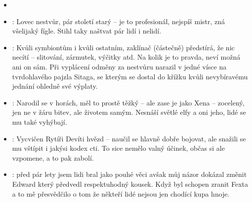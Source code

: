 \documentclass[../main.tex]{subfiles}
\begin{document}
\begin{itemize}
	\item {}
	\item {}: Lovec nestvůr, pár století starý – je to profesionál, nejspíš mistr, zná všelijaký fígle. Stihl taky naštvat pár lidí i nelidí.
	\item {}: Kvůli symbiontům i kvůli ostatním, zaklínač (částečně) předstírá, že nic necítí – slitování, zármutek, výčitky atd. Na kolik je to pravda, neví možná ani on sám. Při vyplácení odměny za nestvůru narazil v jedné vísce na tvrdohlavého pajzla Sitaga, se kterým se dostal do křížku kvůli nevybíravému jednání ohledně své výplaty.
	\item {}: Narodil se v horách, měl to prostě těžký – ale zase je jako Xena – zocelený, jen ne v žáru bitev, ale životem samým. Nesnáší světlé elfy a oni jeho, lidé se mu také vyhýbají.
	\item {}: Vycvičen Rytíři Devíti hvězd – naučil se hlavně dobře bojovat, ale snažili se mu vštípit i jakýsi kodex cti. To sice nemělo valný účinek, občas si ale vzpomene, a to pak zabolí.
	\item {}: před pár lety jsem lidi bral jako pouhé věci avšak můj názor dokázal změnit Edward který předvedl respektuhodný kousek. Když byl schopen zranit Fexta a to mě přesvědčilo o tom že někteří lidé nejsou jen chodící kupa hnoje.
\end{itemize}
\end{document}
